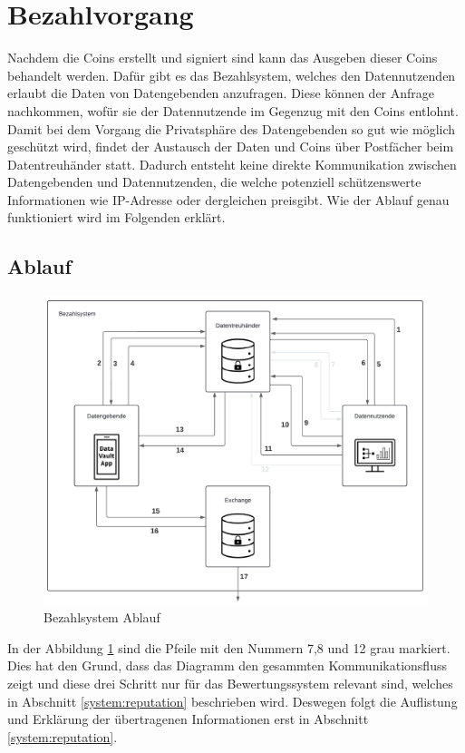 \documentclass{scrreprt}
\begin{document}
\section{Bezahlvorgang}
\label{system:payment}
Nachdem die Coins erstellt und signiert sind kann das Ausgeben dieser Coins behandelt werden. Dafür gibt es das Bezahlsystem,  welches den Datennutzenden erlaubt die Daten von Datengebenden anzufragen. Diese können der Anfrage nachkommen, wofür sie der Datennutzende im Gegenzug mit den Coins entlohnt. Damit bei dem Vorgang die Privatsphäre des Datengebenden so gut wie möglich geschützt wird, findet der Austausch der Daten und Coins über Postfächer beim Datentreuhänder statt. Dadurch entsteht keine direkte Kommunikation zwischen Datengebenden und Datennutzenden, die welche potenziell schützenswerte Informationen wie IP-Adresse oder dergleichen preisgibt. Wie der Ablauf genau funktioniert wird im Folgenden erklärt.

\subsection{Ablauf}
\begin{figure}[H]
    \centering
    \includegraphics[width=0.9\linewidth]{PaymentDiagramm.pdf}
    \caption{Bezahlsystem Ablauf}
    \label{fig:payment}
\end{figure} 

In der Abbildung \ref{fig:payment} sind die Pfeile mit den Nummern 7,8 und 12 grau markiert. Dies hat den Grund, dass das Diagramm den gesammten Kommunikationsfluss zeigt und diese drei Schritt nur für das Bewertungssystem relevant sind, welches in Abschnitt \ref{system:reputation} beschrieben wird. Deswegen folgt die Auflistung und Erklärung der übertragenen Informationen erst in Abschnitt \ref{system:reputation}.
\end{document}
